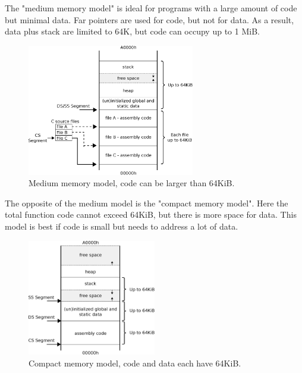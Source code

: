 \documentclass[book.tex]{subfiles}
\begin{document}
\par
The "medium memory model" is ideal for programs with a large amount of code but minimal data. Far pointers are used for code, but not for data. As a result, data
plus stack are limited to 64K, but code can occupy up to 1 MiB. 
\begin{figure}[H]
\centering
\includegraphics[width=0.65\textwidth]{imgs/drawings/memory/medium_mm_v2.eps}
\caption{Medium memory model, code can be larger than 64KiB.}
\label{fig:mm_medium}
\end{figure}

\par
The opposite of the medium model is the "compact memory model". Here the total function code cannot exceed 64KiB, but there is more space for data. This model is best if code is small but needs to address a lot of data.
\begin{figure}[H]
\centering
\includegraphics[width=0.5\textwidth]{imgs/drawings/memory/compact_mm.eps}
\caption{Compact memory model, code and data each have 64KiB.}
\label{fig:mm_compact}
\end{figure}
\end{document}
